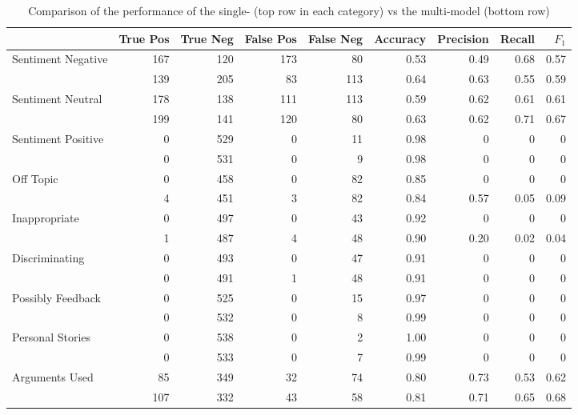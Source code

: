 \documentclass[11pt,a4paper]{article}
\begin{document}
\begin{table}
	\centering\small
	\begin{tabular}{l r r r r r r r r}
		& True Pos & True Neg & False Pos & False Neg & Accuracy & Precision & Recall & $F_1$ \\
		\hline
		Sentiment Negative & 167 & 120 & 173 & 80 & 0.53 & 0.49 & 0.68 & 0.57 \\
		& 139 & 205 & 83 & 113 & 0.64 & 0.63 & 0.55 & 0.59 \\
		\hline
		Sentiment Neutral & 178 & 138 & 111 & 113 & 0.59 & 0.62 & 0.61 & 0.61 \\
		& 199 & 141 & 120 & 80 & 0.63 & 0.62 & 0.71 & 0.67 \\
		\hline
		Sentiment Positive & 0 & 529 & 0 & 11 & 0.98 & 0 & 0 & 0 \\
		& 0 & 531 & 0 & 9 & 0.98 & 0 & 0 & 0 \\
		\hline
		Off Topic & 0 & 458 & 0 & 82 & 0.85 & 0 & 0 & 0 \\
		& 4 & 451 & 3 & 82 & 0.84 & 0.57 & 0.05 & 0.09 \\
		\hline
		Inappropriate & 0 & 497 & 0 & 43 & 0.92 & 0 & 0 & 0 \\
		& 1 & 487 & 4 & 48 & 0.90 & 0.20 & 0.02 & 0.04 \\
		\hline
		Discriminating & 0 & 493 & 0 & 47 & 0.91 & 0 & 0 & 0 \\
		& 0 & 491 & 1 & 48 & 0.91 & 0 & 0 & 0 \\
		\hline
		Possibly Feedback & 0 & 525 & 0 & 15 & 0.97 & 0 & 0 & 0 \\
		& 0 & 532 & 0 & 8 & 0.99 & 0 & 0 & 0 \\
		\hline
		Personal Stories & 0 & 538 & 0 & 2 & 1.00 & 0 & 0 & 0 \\
		& 0 & 533 & 0 & 7 & 0.99 & 0 & 0 & 0 \\
		\hline
		Arguments Used & 85 & 349 & 32 & 74 & 0.80 & 0.73 & 0.53 & 0.62 \\
		& 107 & 332 & 43 & 58 & 0.81 & 0.71 & 0.65 & 0.68 \\
	\end{tabular}
	\caption{Comparison of the performance of the single- (top row in each category) vs the multi-model (bottom row)}
	\label{tab:results}
\end{table}
\end{document}
